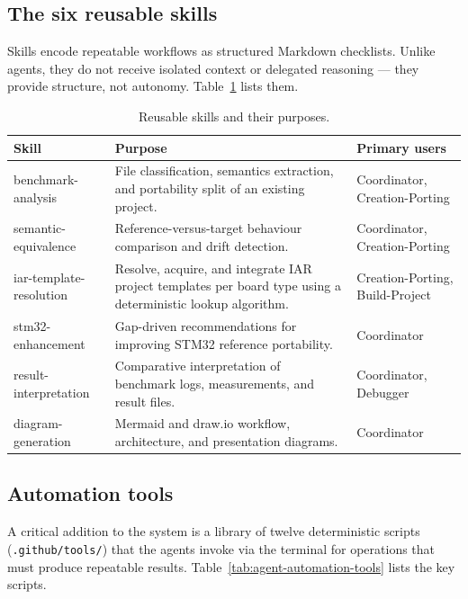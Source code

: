 \subsection{The six reusable skills}
\label{sec:agent-skills}

Skills encode repeatable workflows as structured Markdown checklists. Unlike agents, they
do not receive isolated context or delegated reasoning --- they provide structure, not
autonomy. Table~\ref{tab:agent-skills} lists them.

\begin{table}[H]
\centering
\caption{Reusable skills and their purposes.}
\label{tab:agent-skills}
\begin{tabularx}{\textwidth}{l X l}
\toprule
\textbf{Skill} & \textbf{Purpose} & \textbf{Primary users} \\
\midrule
benchmark-analysis & File classification, semantics extraction, and portability split of an existing project. & Coordinator, Creation-Porting \\
semantic-equivalence & Reference-versus-target behaviour comparison and drift detection. & Coordinator, Creation-Porting \\
iar-template-resolution & Resolve, acquire, and integrate IAR project templates per board type using a deterministic lookup algorithm. & Creation-Porting, Build-Project \\
stm32-enhancement & Gap-driven recommendations for improving STM32 reference portability. & Coordinator \\
result-interpretation & Comparative interpretation of benchmark logs, measurements, and result files. & Coordinator, Debugger \\
diagram-generation & Mermaid and draw.io workflow, architecture, and presentation diagrams. & Coordinator \\
\bottomrule
\end{tabularx}
\end{table}

\subsection{Automation tools}
\label{sec:agent-tools}

A critical addition to the system is a library of twelve deterministic scripts
(\texttt{.github/tools/}) that the agents invoke via the terminal for operations that must
produce repeatable results. Table~\ref{tab:agent-automation-tools} lists the key scripts.

